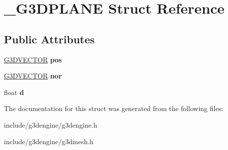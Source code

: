 \hypertarget{struct__G3DPLANE}{}\section{\+\_\+\+G3\+D\+P\+L\+A\+NE Struct Reference}
\label{struct__G3DPLANE}
\subsection*{Public Attributes}
\begin{DoxyCompactItemize}
\item 
\mbox{\label{struct__G3DPLANE_a003c1d4282052dc6040c579ac70aa954}} 
\hyperlink{structG3DVECTOR}{G3\+D\+V\+E\+C\+T\+OR} {\bfseries pos}
\item 
\mbox{\label{struct__G3DPLANE_aeb5e273d2ca0a88368dd15af52df9410}} 
\hyperlink{structG3DVECTOR}{G3\+D\+V\+E\+C\+T\+OR} {\bfseries nor}
\item 
\mbox{\label{struct__G3DPLANE_aba12743b0843886968588b8ad9cc1995}} 
float {\bfseries d}
\end{DoxyCompactItemize}


The documentation for this struct was generated from the following files\+:\begin{DoxyCompactItemize}
\item 
include/g3dengine/g3dengine.\+h\item 
include/g3dengine/g3dmesh.\+h\end{DoxyCompactItemize}
